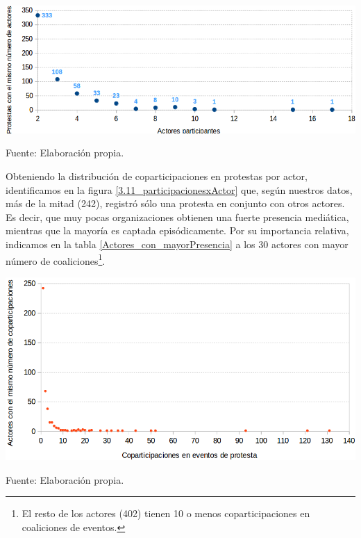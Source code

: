 \documentclass[letterpaper, 11pt]{book}
\theoremstyle{definition}
\theoremstyle{remark}
\begin{document}
\begin{minipage}{\linewidth}
\centering
{} \label{3.10_distribucionActores}
\hspace{-2em}\includegraphics[scale=0.5]{img/3.10_distribucionActores.png}
\par\bigskip
\small Fuente: Elaboración propia.
\end{minipage}\bigskip


Obteniendo la distribución de coparticipaciones en protestas por actor, identificamos en la figura \ref{3.11_participacionesxActor} que, según nuestros datos, más de la mitad (242), registró sólo una protesta en conjunto con otros actores. 
Es decir, que muy pocas organizaciones obtienen una fuerte presencia mediática, mientras que la mayoría es captada episódicamente. 
Por su importancia relativa, indicamos en la tabla  \ref{Actores_con_mayorPresencia} a los 30 actores con mayor número de coaliciones\footnote{
    El resto de los actores (402) tienen 10 o menos coparticipaciones en coaliciones de eventos.
}.




\begin{minipage}{\linewidth}
\centering
{} \label{3.11_participacionesxActor}
\hspace{-2em}\includegraphics[scale=0.47]{img/3.11_participacionesxActor.png}
\par
\small Fuente: Elaboración propia.
\end{minipage}\bigskip
\end{document}
